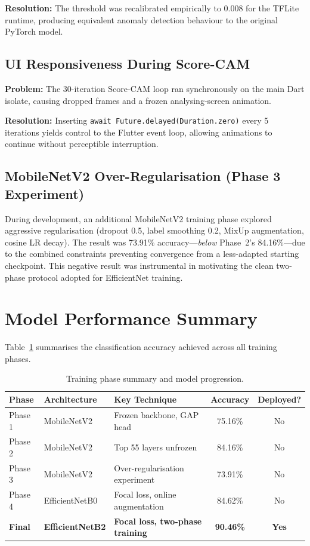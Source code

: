 \textbf{Resolution:} The threshold was recalibrated empirically to 0.008 for the TFLite runtime, producing equivalent anomaly detection behaviour to the original PyTorch model.

\subsection{UI Responsiveness During Score-CAM}

\textbf{Problem:} The 30-iteration Score-CAM loop ran synchronously on the main Dart isolate, causing dropped frames and a frozen analysing-screen animation.

\textbf{Resolution:} Inserting \texttt{await Future.delayed(Duration.zero)} every 5 iterations yields control to the Flutter event loop, allowing animations to continue without perceptible interruption.

\subsection{MobileNetV2 Over-Regularisation (Phase 3 Experiment)}

During development, an additional MobileNetV2 training phase explored aggressive regularisation (dropout 0.5, label smoothing 0.2, MixUp augmentation, cosine LR decay). The result was 73.91\% accuracy---\textit{below} Phase~2's 84.16\%---due to the combined constraints preventing convergence from a less-adapted starting checkpoint. This negative result was instrumental in motivating the clean two-phase protocol adopted for EfficientNet training.


\section{Model Performance Summary}
\label{sec:summary}

Table~\ref{tab:model_summary} summarises the classification accuracy achieved across all training phases.

\begin{table}[H]
\centering
\caption{Training phase summary and model progression.}
\label{tab:model_summary}
\begin{tabular}{|l|l|l|c|c|}
\hline
\textbf{Phase} & \textbf{Architecture} & \textbf{Key Technique} & \textbf{Accuracy} & \textbf{Deployed?} \\ \hline
Phase 1 & MobileNetV2 & Frozen backbone, GAP head & 75.16\% & No \\ \hline
Phase 2 & MobileNetV2 & Top 55 layers unfrozen & 84.16\% & No \\ \hline
Phase 3 & MobileNetV2 & Over-regularisation experiment & 73.91\% & No \\ \hline
Phase 4 & EfficientNetB0 & Focal loss, online augmentation & 84.62\% & No \\ \hline
\textbf{Final} & \textbf{EfficientNetB2} & \textbf{Focal loss, two-phase training} & \textbf{90.46\%} & \textbf{Yes} \\ \hline
\end{tabular}
\end{table}

